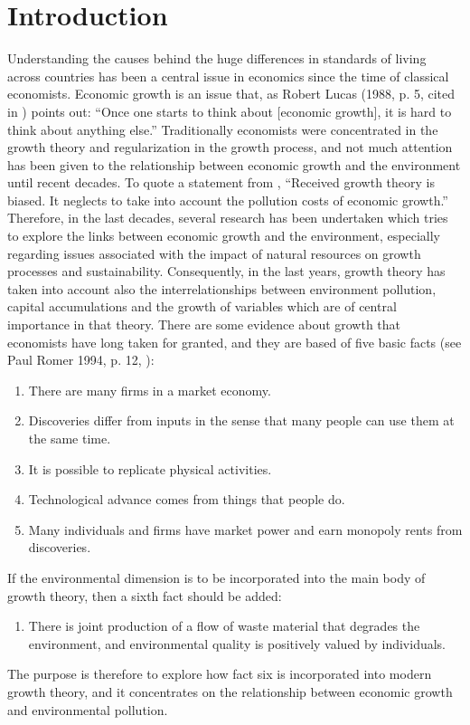 \section{Introduction}\label{sec:introduction} 
Understanding the causes behind the huge differences in standards of living across countries has been a central issue in economics since the time of classical economists. Economic growth is an issue that, as Robert Lucas (1988, p. 5, cited in \cite{maler_chapter_2005}) points out: “Once one starts to think about [economic growth], it is hard to think about anything else.” 
Traditionally economists were concentrated in the growth theory and regularization in the growth process, and not much attention has been given to the relationship between economic growth and the environment until recent decades. To quote a statement from \cite{maler_chapter_2005}, “Received growth theory is biased. It neglects to take into account
the pollution costs of economic growth.” Therefore, in the last decades, several research has been undertaken which tries to explore the links between economic growth and the environment, especially regarding issues associated with the impact of natural resources on growth processes and sustainability. Consequently, in the last years, growth theory has taken into account also the interrelationships between environment pollution, capital accumulations and the growth of variables which are of central importance in that theory. There are some evidence about growth that economists have long taken for granted, and they are based of five basic facts (see Paul Romer 1994, p. 12, \cite{romer_origins_1994}): 
\begin{enumerate}
    \item There are many firms in a market economy.
    \item Discoveries differ from inputs in the sense that many people can use them at the
    same time.
    \item It is possible to replicate physical activities.
    \item Technological advance comes from things that people do.
    \item Many individuals and firms have market power and earn monopoly rents from discoveries.
\end{enumerate}
If the environmental dimension is to be incorporated into the main body of growth
theory, then a sixth fact should be added:
\begin{enumerate}[resume]
	\item There is joint production of a flow of waste material that degrades the environment, and environmental quality is positively valued by individuals.
\end{enumerate}
The purpose is therefore to explore how fact six is incorporated into
modern growth theory, and it concentrates on the relationship between economic growth and environmental pollution.

